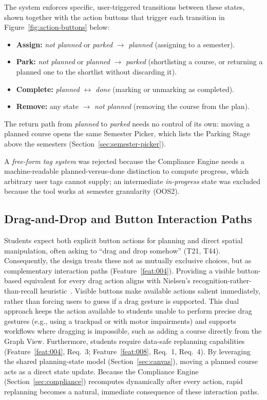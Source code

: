 The system enforces specific, user-triggered transitions between these states, shown together with the action buttons that trigger each transition in Figure~\ref{fig:action-buttons} below:
\begin{itemize}
  \item \textbf{Assign:} \emph{not planned} or \emph{parked} $\to$ \emph{planned} (assigning to a semester).
  \item \textbf{Park:} \emph{not planned} or \emph{planned} $\to$ \emph{parked} (shortlisting a course, or returning a planned one to the shortlist without discarding it).
  \item \textbf{Complete:} \emph{planned} $\leftrightarrow$ \emph{done} (marking or unmarking as completed).
  \item \textbf{Remove:} any state $\to$ \emph{not planned} (removing the course from the plan).
\end{itemize}
The return path from \emph{planned} to \emph{parked} needs no control of its own: moving a planned course opens the same Semester Picker, which lists the Parking Stage above the semesters (Section~\ref{sec:semester-picker}).

A \emph{free-form tag system} was rejected because the Compliance Engine needs a machine-readable planned-versus-done distinction to compute progress, which arbitrary user tags cannot supply; an intermediate \emph{in-progress} state was excluded because the tool works at semester granularity (OOS2).
\subsection{Drag-and-Drop and Button Interaction Paths}
\label{sec:interaction-paths}
Students expect both explicit button actions for planning and direct spatial manipulation, often asking to \enquote{drag and drop somehow} (T21, T44). Consequently, the design treats these not as mutually exclusive choices, but as complementary interaction paths (Feature~\ref{feat:004}). Providing a visible button-based equivalent for every drag action aligns with Nielsen's recognition-rather-than-recall heuristic~\cite{nielsen1994}. Visible buttons make available actions salient immediately, rather than forcing users to guess if a drag gesture is supported. This dual approach keeps the action available to students unable to perform precise drag gestures (e.g., using a trackpad or with motor impairments) and supports workflows where dragging is impossible, such as adding a course directly from the Graph View. Furthermore, students require data-safe replanning capabilities (Feature~\ref{feat:004}, Req.~3; Feature~\ref{feat:008}, Req.~1, Req.~4). By leveraging the shared planning-state model (Section~\ref{sec:canvas}), moving a planned course acts as a direct state update. Because the Compliance Engine (Section~\ref{sec:compliance}) recomputes dynamically after every action, rapid replanning becomes a natural, immediate consequence of these interaction paths.

